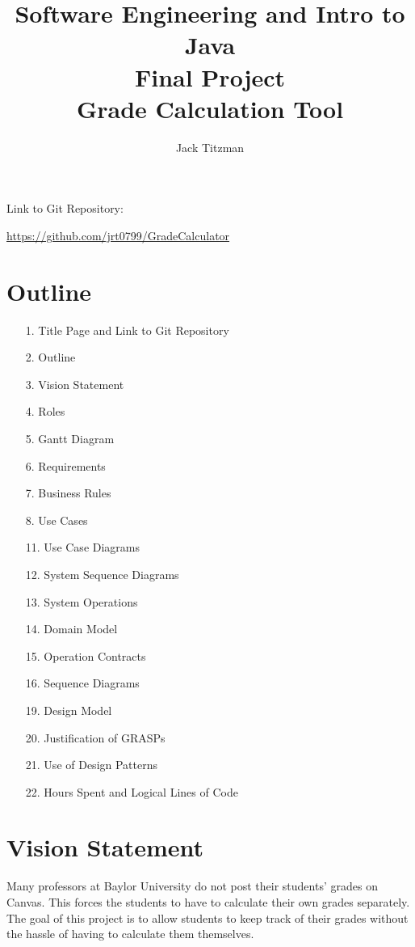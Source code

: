 \documentclass[12pt]{article}
\title{Software Engineering and Intro to Java\\Final Project\\Grade Calculation Tool}
\author{Jack Titzman}
\date{}
\begin{document}
\maketitle 

\vspace*{10cm}
Link to Git Repository:

\href{https://github.com/jrt0799/GradeCalculator}{https://github.com/jrt0799/GradeCalculator}

\newpage

\section*{Outline}
\begin{enumerate}
	\item[1.] Title Page and Link to Git Repository
	\item[2.] Outline
	\item[3.] Vision Statement
	\item[4.] Roles
	\item[5.] Gantt Diagram
	\item[6.] Requirements
	\item[7.] Business Rules
	\item[8.] Use Cases
	\item[11.] Use Case Diagrams
	\item[12.] System Sequence Diagrams
	\item[13.] System Operations
	\item[14.] Domain Model
	\item[15.] Operation Contracts
	\item[16.] Sequence Diagrams
	\item[19.] Design Model
	\item[20.] Justification of GRASPs
	\item[21.] Use of Design Patterns
	\item[22.] Hours Spent and Logical Lines of Code
\end{enumerate}
\newpage

\section*{Vision Statement}

Many professors at Baylor University do not post their students' grades on Canvas. This forces the students to have to calculate their own grades separately. The goal of this project is to allow students to keep track of their grades without the hassle of having to calculate them themselves.
\end{document}
